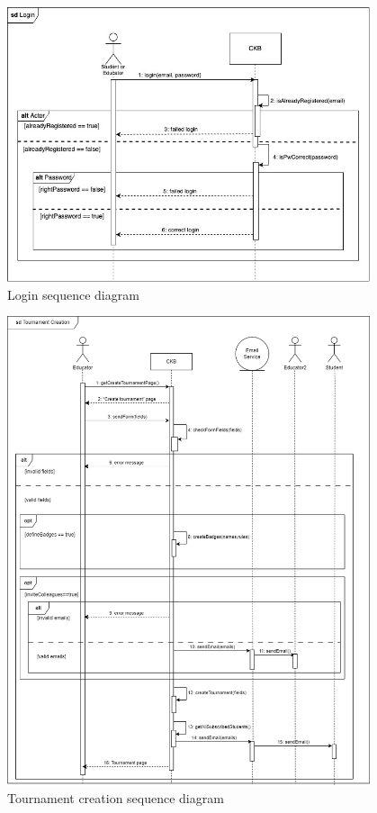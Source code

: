 \begin{figure}[H]
    \centering
    \includegraphics[width=0.95\textwidth]{images/seq_diagrams/Login.jpg}
    \caption{Login sequence diagram}
\end{figure}
\clearpage

\begin{figure}[H]
    \centering
    \includegraphics[width=0.95\textwidth]{images/seq_diagrams/tournament_creation.png}
    \caption{Tournament creation sequence diagram}
\end{figure}
\clearpage

